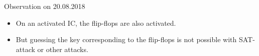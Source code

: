 \begin{frame}{Observation on 20.08.2018}
\begin{itemize}
\item On an activated IC, the flip-flops are also activated. 
\item But guessing the key corresponding to the flip-flops is not possible with SAT-attack or other attacks. 
\end{itemize}
\end{frame}
